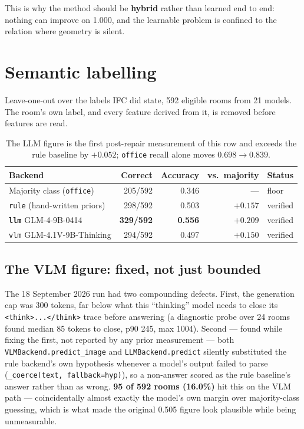 \documentclass[11pt,a4paper]{article}
\newcommand{\code}[1]{\texttt{\small #1}}
\begin{document}
\noindent
This is why the method should be \textbf{hybrid} rather than learned end to end:
nothing can improve on 1.000, and the learnable problem is confined to the
relation where geometry is silent.

\section{Semantic labelling}

Leave-one-out over the labels IFC did state, 592 eligible rooms from 21 models.
The room's own label, and every feature derived from it, is removed before
features are read.

\begin{table}[ht]
\centering
\small
\begin{tabular}{lrrrl}
\toprule
Backend & Correct & Accuracy & vs.\ majority & Status \\
\midrule
Majority class (\code{office}) & 205/592 & 0.346 & --- & floor \\
\code{rule} (hand-written priors) & 298/592 & 0.503 & $+0.157$ & verified \\
\textbf{\code{llm}} GLM-4-9B-0414 & \textbf{329/592} & \textbf{0.556} & $\mathbf{+0.209}$ & verified \\
\code{vlm} GLM-4.1V-9B-Thinking & 294/592 & 0.497 & $+0.150$ & verified \\
\bottomrule
\end{tabular}
\caption{The LLM figure is the first post-repair measurement of this row and
exceeds the rule baseline by $+0.052$; \code{office} recall alone moves
$0.698\to0.839$.}
\end{table}

\subsection{The VLM figure: fixed, not just bounded}

The 18 September 2026 run had two compounding defects. First, the generation
cap was 300 tokens, far below what this ``thinking'' model needs to close its
\code{<think>...</think>} trace before answering (a diagnostic probe over 24
rooms found median 85 tokens to close, p90 245, max 1004). Second --- found
while fixing the first, not reported by any prior measurement --- both
\code{VLMBackend.predict\_image} and \code{LLMBackend.predict} silently
substituted the rule backend's own hypothesis whenever a model's output failed
to parse (\code{\_coerce(text, fallback=hyp)}), so a non-answer scored as the
rule baseline's answer rather than as wrong. \textbf{95 of 592 rooms (16.0\%)}
hit this on the VLM path --- coincidentally almost exactly the model's own
margin over majority-class guessing, which is what made the original 0.505
figure look plausible while being unmeasurable.
\end{document}
